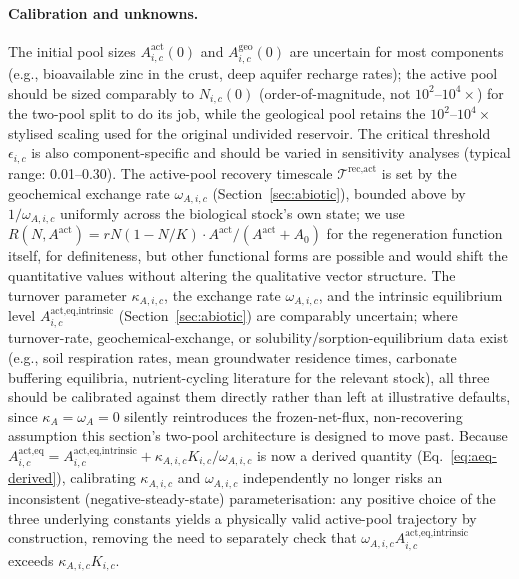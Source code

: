 \documentclass[twocolumn,10pt]{article}
\begin{document}
\paragraph{Calibration and unknowns.}
The initial pool sizes $A^{\text{act}}_{i,c}(0)$ and $A^{\text{geo}}_{i,c}(0)$ are uncertain for most components (e.g., bioavailable zinc in the crust, deep aquifer recharge rates); the active pool should be sized comparably to $N_{i,c}(0)$ (order-of-magnitude, not $10^2$--$10^4\times$) for the two-pool split to do its job, while the geological pool retains the $10^2$--$10^4\times$ stylised scaling used for the original undivided reservoir. The critical threshold $\epsilon_{i,c}$ is also component-specific and should be varied in sensitivity analyses (typical range: 0.01--0.30). The active-pool recovery timescale $\mathcal{T}^{\text{rec},\text{act}}$ is set by the geochemical exchange rate $\omega_{A,i,c}$ (Section~\ref{sec:abiotic}), bounded above by $1/\omega_{A,i,c}$ uniformly across the biological stock's own state; we use $R(N,A^{\text{act}}) = rN(1-N/K) \cdot A^{\text{act}}/(A^{\text{act}}+A_0)$ for the regeneration function itself, for definiteness, but other functional forms are possible and would shift the quantitative values without altering the qualitative vector structure. The turnover parameter $\kappa_{A,i,c}$, the exchange rate $\omega_{A,i,c}$, and the intrinsic equilibrium level $A^{\text{act},\text{eq,intrinsic}}_{i,c}$ (Section~\ref{sec:abiotic}) are comparably uncertain; where turnover-rate, geochemical-exchange, or solubility/sorption-equilibrium data exist (e.g., soil respiration rates, mean groundwater residence times, carbonate buffering equilibria, nutrient-cycling literature for the relevant stock), all three should be calibrated against them directly rather than left at illustrative defaults, since $\kappa_A=\omega_A=0$ silently reintroduces the frozen-net-flux, non-recovering assumption this section's two-pool architecture is designed to move past. Because $A^{\text{act},\text{eq}}_{i,c}=A^{\text{act},\text{eq,intrinsic}}_{i,c}+\kappa_{A,i,c}K_{i,c}/\omega_{A,i,c}$ is now a derived quantity (Eq.~\eqref{eq:aeq-derived}), calibrating $\kappa_{A,i,c}$ and $\omega_{A,i,c}$ independently no longer risks an inconsistent (negative-steady-state) parameterisation: any positive choice of the three underlying constants yields a physically valid active-pool trajectory by construction, removing the need to separately check that $\omega_{A,i,c}A^{\text{act},\text{eq,intrinsic}}_{i,c}$ exceeds $\kappa_{A,i,c}K_{i,c}$.
\end{document}
